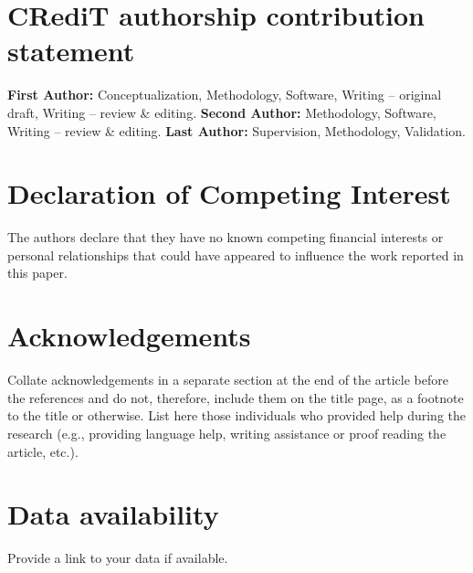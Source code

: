 \documentclass[review]{elsarticle}
\begin{document}
\section*{CRediT authorship contribution statement}
\textbf{First Author:} Conceptualization, Methodology, Software, Writing – original draft, Writing – review \& editing. \textbf{Second Author:} Methodology, Software, Writing – review \& editing. \textbf{Last Author:} Supervision, Methodology, Validation.

\section*{Declaration of Competing Interest}
The authors declare that they have no known competing financial interests or personal relationships that could have appeared to influence the work reported in this paper.

\section*{Acknowledgements}
Collate acknowledgements in a separate section at the end of the article before the references and do not, therefore, include them on the title page, as a footnote to the title or otherwise. List here those individuals who provided help during the research (e.g., providing language help, writing assistance or proof reading the article, etc.).

\section*{Data availability}
Provide a link to your data if available.


\end{document}
